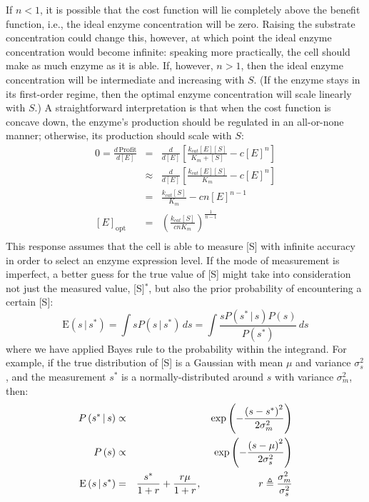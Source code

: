 \documentclass{article}
\begin{document}
If $n<1$, it is possible that the cost function will lie completely above the benefit function, i.e., the ideal enzyme concentration will be zero. Raising the substrate concentration could change this, however, at which point the ideal enzyme concentration would become infinite: speaking more practically, the cell should make as much enzyme as it is able. If, however, $n>1$, then the ideal enzyme concentration will be intermediate and increasing with $S$. (If the enzyme stays in its first-order regime, then the optimal enzyme concentration will scale linearly with $S$.)  A straightforward interpretation is that when the cost function is concave down, the enzyme's production should be regulated in an all-or-none manner; otherwise, its production should scale with $S$:
\begin{eqnarray*}
0 = \frac{d \, \textrm{Profit}}{d\left[ E \right]} & = & \frac{d}{d\left[ E \right]} \left[  \frac{k_{cat} \left[ E \right] \left[ S \right] }{K_m + \left[ S \right] } -  c \left[ E \right]^n \right]\\
& \approx & \frac{d}{d \left[ E \right]} \left[ \frac{k_{cat} \left[ E \right] \left[ S \right] }{K_m} -  c \left[ E \right]^n  \right]\\
& = & \frac{k_{cat} \left[ S \right] }{K_m} -  c n \left[ E \right]^{n-1}\\
 \left[ E \right]_{\textrm{opt}} & = & \left( \frac{k_{cat} \left[ S \right]}{c n K_m} \right)^{\frac{1}{n-1}} \\
\end{eqnarray*}
This response assumes that the cell is able to measure [S] with infinite accuracy in order to select an enzyme expression level. If the mode of measurement is imperfect, a better guess for the true value of [S] might take into consideration not just the measured value, [S]$^*$, but also the prior probability of encountering a certain [S]:
\[ \textrm{E} \left( s \, | \,s^* \right) = \int s  P\left( s \, | \, s^* \right) \, ds =  \int \frac{ s P\left( s^* \, | \, s \right)P\left( s \right)}{P \left( s^* \right)} \, ds\]
where we have applied Bayes rule to the probability within the integrand. For example, if the true distribution of [S] is a Gaussian with mean $\mu$ and variance $\sigma_s^2$, and the measurement $s^*$ is a normally-distributed around $s$ with variance $\sigma_m^2$, then:
\begin{eqnarray*}
P\left( s^* \, | \, s \right) & \propto & \exp \left( -\frac{\left(s - s^*\right)^2}{2\sigma_m^2} \right)\\
P\left( s \right) & \propto & \exp \left( -\frac{\left(s - \mu\right)^2}{2\sigma_s^2} \right)\\
 \textrm{E} \left( s \, | \,s^* \right)  & = & \frac{s^*}{1+r} + \frac{r \mu}{1 + r}, \hspace{2 cm} r \triangleq \frac{\sigma_m^2}{\sigma_s^2}
\end{eqnarray*}
\end{document}
